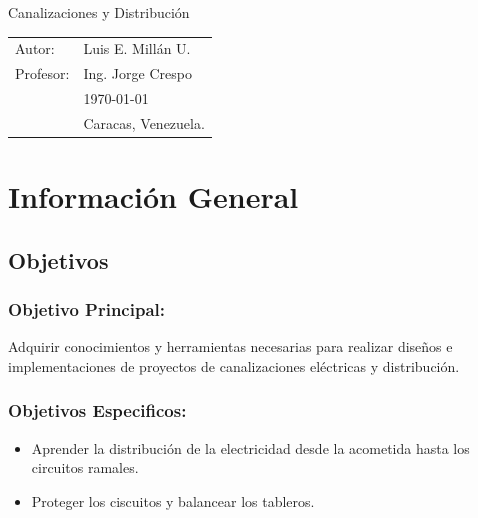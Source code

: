 \documentclass[11pt,letterpaper]{article}
\begin{document}
\newpage
\pagestyle{fancy}
\fancyhf{}
\vspace*{6cm}
\begin{center}
\Huge  {Canalizaciones y Distribución}\\
\vspace{1cm}
\end{center}
\vfill
\begin{flushright}
\begin{tabular}{ll}
Autor: & Luis E. Millán U.\\
Profesor: & Ing. Jorge Crespo\\
& \today\\
& Caracas, Venezuela.
\end{tabular}
\end{flushright}

\newpage
\pagestyle{fancy}
\fancyhf{}
\fancyhead[L]{\rightmark}
\fancyhead[R]{\small \rm \textbf{\thepage}}
\renewcommand{\sectionmark}[1]{\markright{\thesection.\ #1}}
\renewcommand{\headrulewidth}{0.5pt}
\renewcommand{\footrulewidth}{0.5pt}
\tableofcontents
\newpage
\section{Información General}
\subsection{Objetivos}
\subsubsection{Objetivo Principal:}
Adquirir conocimientos y herramientas necesarias para realizar diseños e implementaciones de proyectos de canalizaciones eléctricas y distribución.
\subsubsection{Objetivos Especificos:}
\begin{itemize}
	\item Aprender la distribución de la electricidad desde la acometida hasta los circuitos ramales.
	\item Proteger los ciscuitos y balancear los tableros.
\end{itemize}
\end{document}
